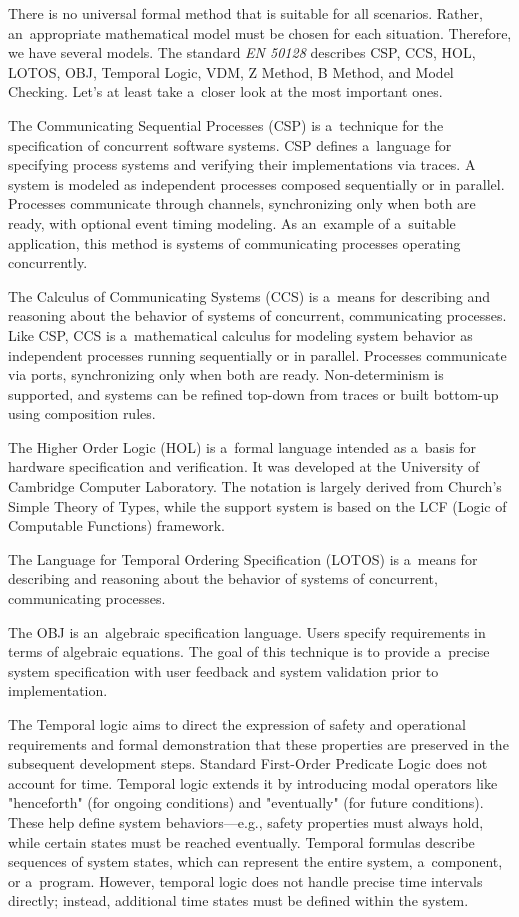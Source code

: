 There is no universal formal method that is suitable for all scenarios. Rather, an~appropriate mathematical model must be chosen for each situation. Therefore, we have several models. The standard {\it EN 50128} describes CSP, CCS, HOL, LOTOS, OBJ, Temporal Logic, VDM, Z Method, B Method, and Model Checking. Let's at least take a~closer look at the most important ones.

The {\sbf Communicating Sequential Processes (CSP)} is a~technique for the specification of concurrent software systems. CSP defines a~language for specifying process systems and verifying their implementations via traces. A system is modeled as independent processes composed sequentially or in parallel. Processes communicate through channels, synchronizing only when both are ready, with optional event timing modeling.  As an~example of a~suitable application, this method is systems of communicating processes operating concurrently.

The {\sbf Calculus of Communicating Systems (CCS)} is a~means for describing and reasoning about the behavior of systems of concurrent, communicating processes. Like CSP, CCS is a~mathematical calculus for modeling system behavior as independent processes running sequentially or in parallel. Processes communicate via ports, synchronizing only when both are ready. Non-determinism is supported, and systems can be refined top-down from traces or built bottom-up using composition rules.

The {\sbf Higher Order Logic (HOL)} is a~formal language intended as a~basis for hardware specification and verification. It was developed at the University of Cambridge Computer Laboratory. The notation is largely derived from Church's Simple Theory of Types, while the support system is based on the LCF (Logic of Computable Functions) framework.

The {\sbf Language for Temporal Ordering Specification (LOTOS)} is a~means for describing and reasoning about the behavior of systems of concurrent, communicating processes.

The {\sbf OBJ} is an~algebraic specification language. Users specify requirements in terms of algebraic equations. The goal of this technique is to provide a~precise system specification with user feedback and system validation prior to implementation.

The {\sbf Temporal logic} aims to direct the expression of safety and operational requirements and formal demonstration that these properties are preserved in the subsequent development steps. Standard First-Order Predicate Logic does not account for time. Temporal logic extends it by introducing modal operators like "henceforth" (for ongoing conditions) and "eventually" (for future conditions). These help define system behaviors—e.g., safety properties must always hold, while certain states must be reached eventually. Temporal formulas describe sequences of system states, which can represent the entire system, a~component, or a~program. However, temporal logic does not handle precise time intervals directly; instead, additional time states must be defined within the system.

